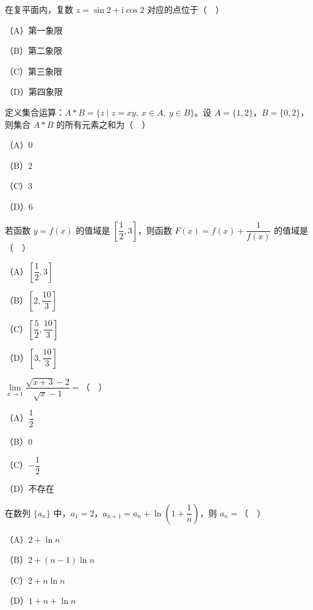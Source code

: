 


\begin{question}
在复平面内，复数 $z=\sin2+\mathrm i\cos2$ 对应的点位于（　）

（A）第一象限

（B）第二象限

（C）第三象限

（D）第四象限

\end{question}
\begin{question}
定义集合运算：$A*B=\{z\mid z=xy,\ x\in A,\ y\in B\}$。设 $A=\{1,2\}$，$B=\{0,2\}$，则集合 $A*B$ 的所有元素之和为（　）

（A）$0$

（B）$2$

（C）$3$

（D）$6$

\end{question}
\begin{question}
若函数 $y=f(x)$ 的值域是 $\left[\dfrac12,3\right]$，则函数 $F(x)=f(x)+\dfrac1{f(x)}$ 的值域是（　）

（A）$\left[\dfrac12,3\right]$

（B）$\left[2,\dfrac{10}3\right]$

（C）$\left[\dfrac52,\dfrac{10}3\right]$

（D）$\left[3,\dfrac{10}3\right]$

\end{question}
\begin{question}
$\lim\limits_{x\to1}\dfrac{\sqrt{x+3}-2}{\sqrt x-1}=$（　）

（A）$\dfrac12$

（B）$0$

（C）$-\dfrac12$

（D）不存在

\end{question}
\begin{question}
在数列 $\{a_n\}$ 中，$a_1=2$，$a_{n+1}=a_n+\ln\left(1+\dfrac1n\right)$，则 $a_n=$（　）

（A）$2+\ln n$

（B）$2+(n-1)\ln n$

（C）$2+n\ln n$

（D）$1+n+\ln n$

\Needspace{0.4\textheight}
\end{question}
